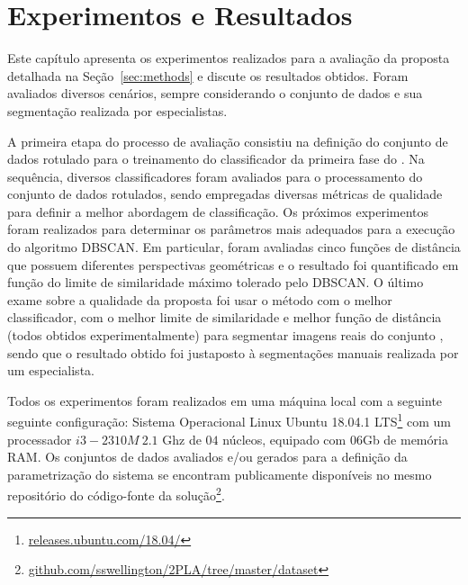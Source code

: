 \clearpage
\section{Experimentos e Resultados} \label{sec:exp_result}

Este capítulo apresenta os experimentos realizados para a avaliação da proposta \system detalhada na Seção~\ref{sec:methods} e discute os resultados obtidos.
Foram avaliados diversos cenários, sempre considerando o conjunto de dados \dataset e sua segmentação realizada por especialistas.

A primeira etapa do processo de avaliação consistiu na definição do conjunto de dados rotulado para o treinamento do classificador da primeira fase do \system.
Na sequência, diversos classificadores foram avaliados para o processamento do conjunto de dados rotulados, sendo empregadas diversas métricas de qualidade para definir a melhor abordagem de classificação.
Os próximos experimentos foram realizados para determinar os parâmetros mais adequados para a execução do algoritmo DBSCAN.
Em particular, foram avaliadas cinco funções de distância que possuem diferentes perspectivas geométricas e o resultado foi quantificado em função do limite de similaridade máximo tolerado pelo DBSCAN.
O último exame sobre a qualidade da proposta foi usar o método \system com o melhor classificador, com o melhor limite de similaridade e melhor função de distância (todos obtidos experimentalmente) para segmentar imagens reais do conjunto \dataset, sendo que o resultado obtido foi justaposto à segmentações manuais realizada por um especialista.

Todos os experimentos foram realizados em uma máquina local com a seguinte seguinte configuração: Sistema Operacional Linux Ubuntu 18.04.1 LTS\footnote{\url{releases.ubuntu.com/18.04/}} com um processador $i3 - 2310M  ~ 2.1$ Ghz de $04$ núcleos, equipado com 06Gb de memória RAM.
Os conjuntos de dados avaliados e/ou gerados para a definição da parametrização do sistema se encontram publicamente disponíveis no mesmo repositório do código-fonte da solução\footnote{\url{github.com/sswellington/2PLA/tree/master/dataset}}.
